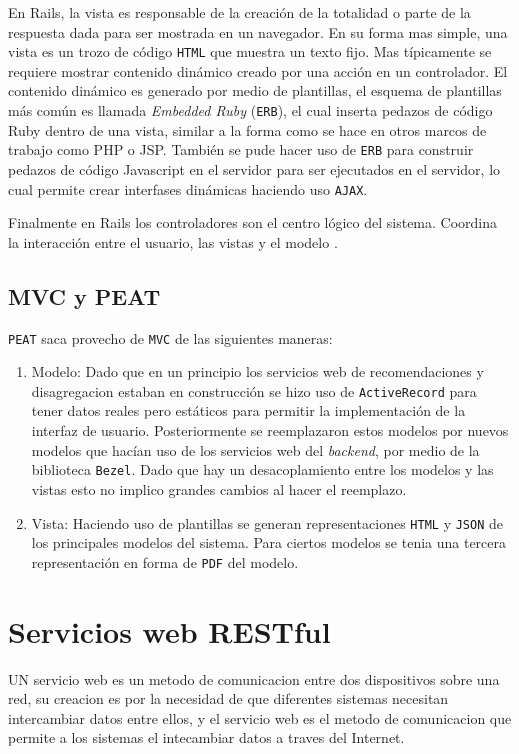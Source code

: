 En Rails, la vista es responsable de la creación de la totalidad o parte de la
respuesta dada para ser mostrada en un navegador. En su forma mas simple, una
vista es un trozo de código \texttt{HTML} que muestra un texto fijo. Mas típicamente
se requiere mostrar contenido dinámico creado por una acción en un controlador.
El contenido dinámico es generado por medio de plantillas, el esquema
de plantillas más común es llamada \textit{Embedded Ruby} (\texttt{ERB}),
el cual inserta pedazos de código Ruby dentro de una vista, similar a la forma
como se hace en otros marcos de trabajo como PHP o JSP. También se pude hacer uso de
\texttt{ERB} para construir pedazos de código Javascript en el servidor
para ser ejecutados en el servidor, lo cual permite crear interfases
dinámicas haciendo uso \texttt{AJAX}.

Finalmente en Rails los controladores son el centro lógico del sistema. Coordina
la interacción entre el usuario, las vistas y el modelo \cite[pag.~29]{15_agile_hansson}.

\subsection{MVC y PEAT}
\texttt{PEAT} saca provecho de \texttt{MVC} de las siguientes maneras:

\begin{enumerate}
\item Modelo: Dado que en un principio los servicios web de recomendaciones y
  disagregacion estaban en construcción se hizo uso de \texttt{ActiveRecord}
  para tener datos reales pero estáticos para permitir la implementación
  de la interfaz de usuario. Posteriormente se reemplazaron estos modelos
  por nuevos modelos que hacían uso de los servicios web del \textit{backend},
  por medio de la biblioteca \texttt{Bezel}. Dado que hay un desacoplamiento
  entre los modelos y las vistas esto no implico grandes cambios al hacer el
  reemplazo.
\item Vista: Haciendo uso de plantillas se generan representaciones \texttt{HTML}
  y \texttt{JSON} de los principales modelos del sistema. Para ciertos modelos se
  tenia una tercera representación en forma de \texttt{PDF} del modelo.
\end{enumerate}

\section{Servicios web RESTful}
UN servicio web es un metodo de comunicacion entre dos dispositivos sobre una red,
su creacion es por la necesidad de que diferentes sistemas necesitan intercambiar
datos entre ellos, y el servicio web es el metodo de comunicacion que permite a
los sistemas el intecambiar datos a traves del Internet.

